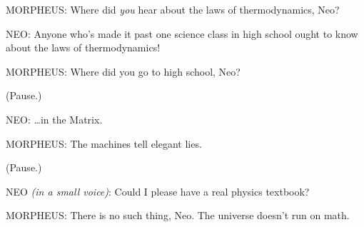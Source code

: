 MORPHEUS: Where did \emph{you} hear about the laws of thermodynamics, Neo?

NEO: Anyone who's made it past one science class in high school ought to know
about the laws of thermodynamics!

MORPHEUS: Where did you go to high school, Neo?

(Pause.)

NEO: {\ldots}in the Matrix.

MORPHEUS: The machines tell elegant lies.

(Pause.)

NEO \emph{(in a small voice)}: Could I please have a real physics textbook?

MORPHEUS: There is no such thing, Neo. The universe doesn't run on math.
